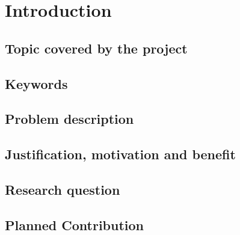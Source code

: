 \chapter{Introduction}
\label{chap:introduction}

\section{Topic covered by the project}

\section{Keywords}

\section{Problem description}
\label{sec:ProblemDescription}


  





\section{Justification, motivation and benefit}
\section{Research question}

\section{Planned Contribution}

